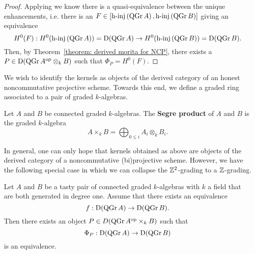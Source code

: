 \documentclass[dissertation.tex]{subfiles}
\begin{document}
\begin{proof}
  Applying \cite[Theorem 1]{Lunts-Orlov} we know there is a quasi-equivalence between the unique enhancements, i.e. there is an \( F \in [ \operatorname{h-inj}\left( \operatorname{QGr}A\right), \operatorname{h-inj}\left( \operatorname{QGr}B\right) ]\) giving an equivalence
  \begin{displaymath}
    H^0(F) : H^0(\operatorname{h-inj}\left( \operatorname{QGr}A \right)) = \mathrm{D}(\operatorname{QGr}A) \to H^0(\operatorname{h-inj}\left( \operatorname{QGr}B \right)) = \mathrm{D}(\operatorname{QGr}B).
  \end{displaymath}
  Then, by Theorem~\ref{theorem: derived morita for NCP}, there exists a \(P \in \mathrm{D}(\operatorname{QGr}A^{\operatorname{op}} \otimes_k B)\) such that \(\Phi_P = H^0(F)\). 
\end{proof}

We wish to identify the kernels as objects of the derived category of an honest noncommutative projective scheme.  Towards this end, we define a graded ring associated to a pair of graded \(k\)-algebras.
\begin{definition}\label{def: segre product}
  Let \(A\) and \(B\) be connected graded \(k\)-algebras.
  The \textbf{Segre product} of \(A\) and \(B\) is the graded \(k\)-algebra
  \[ A \times_k B = \bigoplus_{0 \leq i} A_i \otimes_k B_i.\]
\end{definition}

In general, one can only hope that kernels obtained as above are objects of the derived category of a noncommutative (bi)projective scheme.
However, we have the following special case in which we can collapse the \(\mathbb{Z}^2\)-grading to a \(\mathbb{Z}\)-grading.
\begin{corollary} \label{corollary: NCP morita degree 1}
  Let \(A\) and \(B\) be a tasty pair of connected graded \(k\)-algebras with \(k\) a field that are both generated in degree one.
  Assume that there exists an equivalence
  \begin{displaymath}
    f : \mathrm{D} (\operatorname{QGr}A) \to \mathrm{D} (\operatorname{QGr}B).
  \end{displaymath}
  Then there exists an object \(P \in D ( \operatorname{QGr}A^{\operatorname{op}} \times_k B )\) such that 
  \begin{displaymath}
    \Phi_P : \mathrm{D} ( \operatorname{QGr}A) \to \mathrm{D} (\operatorname{QGr}B )
  \end{displaymath}
  is an equivalence.
\end{corollary}
\end{document}

